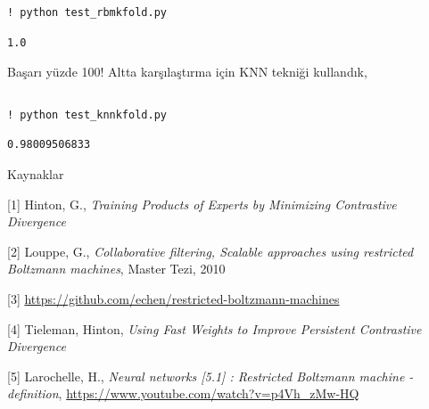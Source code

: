 \documentclass[12pt,fleqn]{article}\usepackage{../../common}
\begin{document}
\begin{verbatim}
! python test_rbmkfold.py
\end{verbatim}

\begin{verbatim}
1.0
\end{verbatim}

Başarı yüzde 100! Altta karşılaştırma için KNN tekniği kullandık,

\inputminted[fontsize=\footnotesize]{python}{test_knnkfold.py}

\begin{verbatim}
! python test_knnkfold.py
\end{verbatim}

\begin{verbatim}
0.98009506833
\end{verbatim}

Kaynaklar

[1] Hinton, G., 
    {\em Training Products of Experts by Minimizing Contrastive Divergence}

[2] Louppe, G., 
    {\em Collaborative filtering, Scalable approaches using restricted Boltzmann machines}, Master Tezi, 2010

[3] \url{https://github.com/echen/restricted-boltzmann-machines}

[4] Tieleman, Hinton, {\em Using Fast Weights to Improve Persistent Contrastive Divergence}

[5] Larochelle, H., {\em Neural networks [5.1] : Restricted Boltzmann machine - definition}, 
    \url{https://www.youtube.com/watch?v=p4Vh_zMw-HQ}
\end{document}
